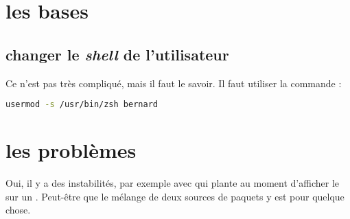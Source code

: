 \section{les bases}
\subsection{changer le \emph{shell} de l'utilisateur}
Ce n'est pas très compliqué, mais il faut le savoir. Il faut utiliser la commande  :

\begin{lstlisting}[language=sh, frame=single, caption=changer le shell par défaut]
usermod -s /usr/bin/zsh bernard
\end{lstlisting}

\section{les problèmes}
Oui, il y a des instabilités, par exemple avec  qui plante au moment d'afficher le  sur un . Peut-être que le mélange de deux sources de paquets y est pour quelque chose.

